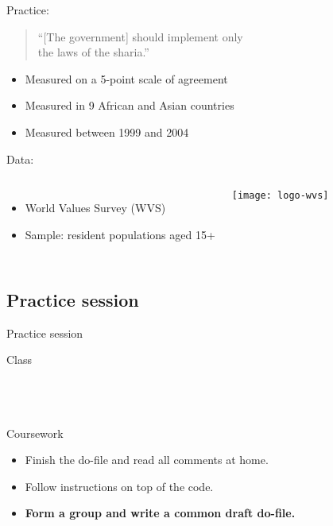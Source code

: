 \documentclass[t]{beamer}
\begin{document}
	\begin{frame}[t]{Practice: }

		\begin{quote}
		``[The government] should implement only \\
		the laws of the sharia.''\\[1em]
		\end{quote}
		
		\begin{itemize}
			\item Measured on a 5-point scale of agreement
			\item Measured in 9 African and Asian countries
			\item Measured between 1999 and 2004
		\end{itemize}

		\vspace{1em}
		
    Data:
	
			\begin{columns}[c]
				
				\begin{itemize}
					\item World Values Survey (WVS)
					\item Sample: resident populations aged 15+
				\end{itemize}
	
				\texttt{[image: logo-wvs]}
			\end{columns}
	
	\end{frame}

	\subsection{Practice session}
  
	\begin{frame}[t]{Practice session}

    \begin{block}{Class}
      \\
      \\
      
			\\
			\\    
    \end{block}

    \begin{alertblock}{Coursework}
      \begin{itemize}
	       \item Finish the do-file and read all comments at home.
	       \item Follow instructions on top of the code.
	       \item \textbf{Form a group and write a common draft do-file.}
      \end{itemize}
    \end{alertblock}
    		
	\end{frame}
  
\end{document}
